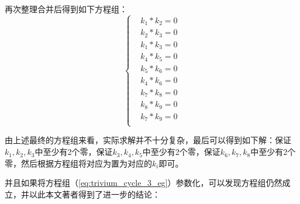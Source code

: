 再次整理合并后得到如下方程组：
\begin{equation}
\left\{
\begin{aligned}
&k_{1}*k_{2}=0\\
&k_{2}*k_{3}=0\\
&k_{1}*k_{3}=0\\
&k_{4}*k_{5}=0\\
&k_{5}*k_{6}=0\\
&k_{4}*k_{6}=0\\
&k_{7}*k_{8}=0\\
&k_{8}*k_{9}=0\\
&k_{7}*k_{9}=0\\
\end{aligned}
\right.
\end{equation}

由上述最终的方程组来看，实际求解并不十分复杂，最后可以得到如下解：保证$k_{1},k_{2},k_{3}$中至少有2个零，保证$k_{3},k_{4},k_{5}$中至少有2个零，保证$k_{6},k_{7},k_{8}$中至少有2个零，然后根据方程组将对应为置为对应的$k_{i}$即可。

并且如果将方程组（\ref{eq:trivium_cycle_3_eg}）参数化，可以发现方程组仍然成立，并以此本文著者得到了进一步的结论：

